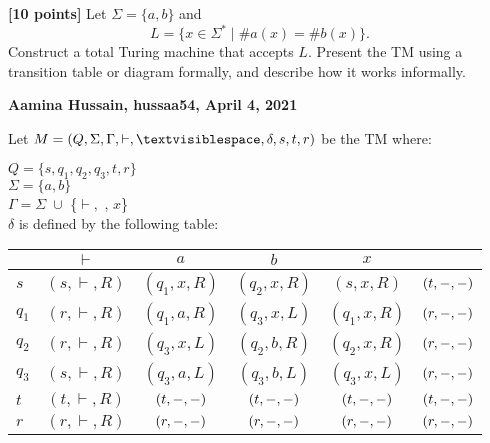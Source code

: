 \documentclass[11pt,fleqn]{article}
\newcommand{\bc}{\begin{center}}
\newcommand{\ec}{\end{center}}
\newcommand{\set}[1]{{\{ #1 \}}}
\begin{document}
\clearpage
  \item \textbf{[10 points]} Let $\Sigma = \set{a,b}$ and \[L = \set{x
    \in \Sigma^* \mid \#a(x) = \#b(x)}.\] Construct a total Turing
    machine that accepts $L$.  Present the TM using a transition table
    or diagram formally, and describe how it works informally.

  \bigskip

  \textbf{Aamina Hussain, hussaa54, April 4, 2021}

Let $M = (Q, \Sigma, \Gamma, \vdash, \textvisiblespace, \delta, s, t, r)$ be the TM where:

$Q = \set{s, q_1, q_2, q_3, t, r}$\\
$\Sigma = \set{a, b}$\\
$\Gamma = \Sigma \; \cup$ \{$\vdash,$ \textvisiblespace, $x$\}\\
$\delta$ is defined by the following table:

  \bc
  \begin{table}[h]
  \centering
  \begin{tabular}{l|ccccc}
        & $\vdash$         & $a$             & $b$             & $x$             & \textvisiblespace\\
  \hline
  $s$   & $(s, \vdash, R)$ & $(q_1, x, R)$   & $(q_2, x, R)$   & $(s, x, R)$     & $(t, \--, \--)$  \\
  $q_1$ & $(r, \vdash, R)$ & $(q_1, a, R)$   & $(q_3, x, L)$   & $(q_1, x, R)$   & $(r, \--, \--)$  \\
  $q_2$ & $(r, \vdash, R)$ & $(q_3, x, L)$   & $(q_2, b, R)$   & $(q_2, x, R)$   & $(r, \--, \--)$  \\
  $q_3$ & $(s, \vdash, R)$ & $(q_3, a, L)$   & $(q_3, b, L)$   & $(q_3, x, L)$   & $(r, \--, \--)$  \\
  $t$   & $(t, \vdash, R)$ & $(t, \--, \--)$ & $(t, \--, \--)$ & $(t, \--, \--)$ & $(t, \--, \--)$  \\
  $r$   & $(r, \vdash, R)$ & $(r, \--, \--)$ & $(r, \--, \--)$ & $(r, \--, \--)$ & $(r, \--, \--)$ 
  \end{tabular}
  \end{table}
  \ec
\end{document}
